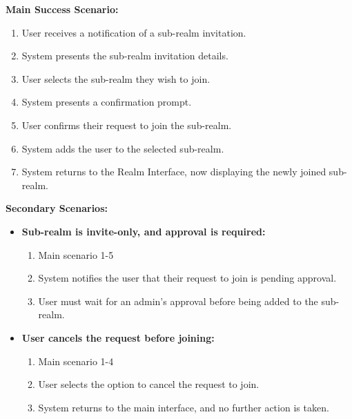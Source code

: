 \documentclass{article}
\begin{document}
\begin{enumerate}[label=\textbf{UC\arabic*}]
          \textbf{Main Success Scenario:}
          \begin{enumerate}[label=\textbf{\arabic*.}]
              \item User receives a notification of a sub-realm invitation.
              \item System presents the sub-realm invitation details.
              \item User selects the sub-realm they wish to join.
              \item System presents a confirmation prompt.
              \item User confirms their request to join the sub-realm.
              \item System adds the user to the selected sub-realm.
              \item System returns to the Realm Interface, now displaying the newly joined sub-realm.
          \end{enumerate}

          \textbf{Secondary Scenarios:}
          \begin{itemize}
              \item[{}] \textbf{Sub-realm is invite-only, and approval is required:}
                    \begin{enumerate}[label=\textbf{\arabic*.}]
                        \item Main scenario 1-5
                        \item System notifies the user that their request to join is pending approval.
                        \item User must wait for an admin’s approval before being added to the sub-realm.
                    \end{enumerate}

              \item[{}] \textbf{User cancels the request before joining:}
                    \begin{enumerate}[label=\textbf{\arabic*.}]
                        \item Main scenario 1-4
                        \item User selects the option to cancel the request to join.
                        \item System returns to the main interface, and no further action is taken.
                    \end{enumerate}
          \end{itemize}


\end{enumerate}
\end{document}
